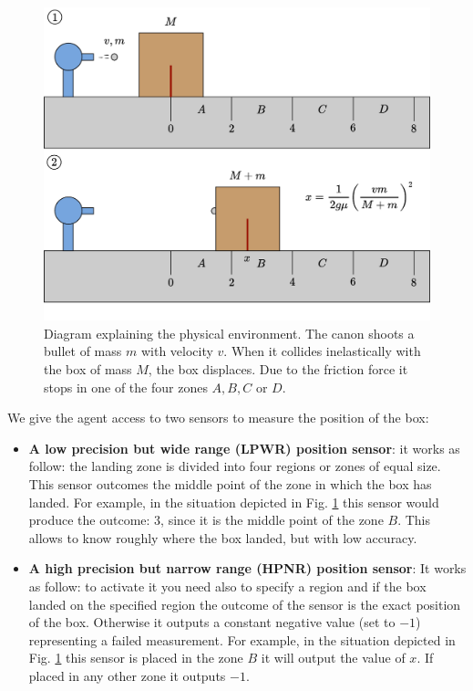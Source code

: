 \documentclass[11pt,a4paper,twoside]{report}
\newcommand{\+}{\textnormal{+} }
\theoremstyle{definition}
\numberwithin{equation}{chapter}
\begin{document}
\begin{figure}[t]
  \centering
  \includegraphics[scale=0.5]{figures/Experiment2.pdf}
  \caption{Diagram explaining the physical environment. The canon shoots a 
  bullet of mass $m$ with velocity $v$. When it collides inelastically with the 
  box of mass $M$, the box displaces. Due to the friction force it stops in
  one of the four zones $A, B, C$ or $D$.}
  \label{fig:Box}
\end{figure}

We give the agent access to two sensors to measure the position of the box:
\begin{itemize}
\item \textbf{A low precision but wide range (LPWR) position  sensor}: it works
as follow: the landing zone is divided into four regions or zones of equal size.
This sensor outcomes the middle point of the zone in which the box has landed.
For example, in the situation depicted in Fig. \ref{fig:Box} this sensor would
produce the outcome: $3$, since it is the middle point of the zone $B$. This
allows to know roughly where the box landed, but with low accuracy. 
\item \textbf{A high precision but narrow range (HPNR) position sensor}: It
works as follow: to activate it you need also to specify a region and if the box
landed on the specified region the outcome of the sensor is the exact position
of the box. Otherwise it outputs a constant negative value (set to $-1$)
representing a failed measurement. For example, in the situation depicted in
Fig. \ref{fig:Box} this sensor is placed in the zone $B$ it will output the
value of $x$. If placed in any other zone it outputs $-1$.
\end{itemize}
\end{document}
